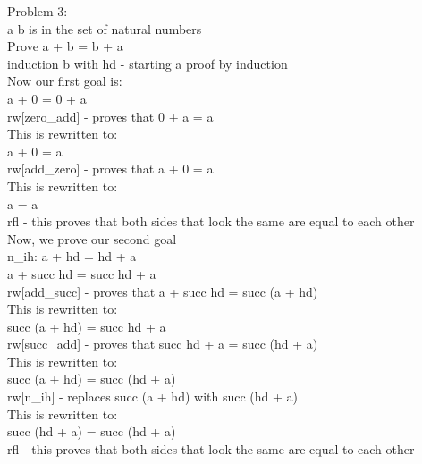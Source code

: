 \documentclass{article}
\theoremstyle{theorem}
\theoremstyle{definition}
\theoremstyle{remark}
\begin{document}
Problem 3:\\
a b is in the set of natural numbers\\
Prove a + b = b + a\\
induction b with hd - starting a proof by induction\\
Now our first goal is:\\
a + 0 = 0 + a\\
rw[zero\_add] - proves that 0 + a = a\\
This is rewritten to:\\
a + 0 = a\\
rw[add\_zero] - proves that a + 0 = a\\
This is rewritten to:\\
a = a\\
rfl - this proves that both sides that look the same are equal to each other \\
Now, we prove our second goal\\
n\_ih: a + hd = hd + a\\
a + succ hd = succ hd + a\\
rw[add\_succ] - proves that a + succ hd = succ (a + hd)\\
This is rewritten to:\\
succ (a + hd) = succ hd + a\\
rw[succ\_add] - proves that succ hd + a = succ (hd + a)\\
This is rewritten to:\\
succ (a + hd) = succ (hd + a)\\
rw[n\_ih] - replaces succ (a + hd) with succ (hd + a)\\
This is rewritten to:\\
succ (hd + a) = succ (hd + a)\\
rfl - this proves that both sides that look the same are equal to each other \\
\end{document}
